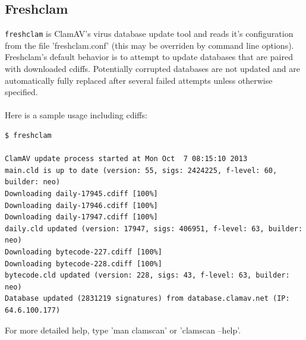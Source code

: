 \documentclass[a4paper,titlepage,12pt]{article}
\begin{document}
    \subsection{Freshclam}\label{sec:freshclam}
    \verb+freshclam+ is ClamAV's virus database update tool and reads it's
    configuration from the file 'freshclam.conf' (this may be
    overriden by command line options). Freshclam's default behavior is to
    attempt to update databases that are paired with downloaded cdiffs.
    Potentially corrupted databases are not updated and are automatically
    fully replaced after several failed attempts unless otherwise specified.
    \\\\
    Here is a sample usage including cdiffs:
{\footnotesize
    \begin{verbatim}
$ freshclam

ClamAV update process started at Mon Oct  7 08:15:10 2013
main.cld is up to date (version: 55, sigs: 2424225, f-level: 60, builder: neo)
Downloading daily-17945.cdiff [100%]
Downloading daily-17946.cdiff [100%]
Downloading daily-17947.cdiff [100%]
daily.cld updated (version: 17947, sigs: 406951, f-level: 63, builder: neo)
Downloading bytecode-227.cdiff [100%]
Downloading bytecode-228.cdiff [100%]
bytecode.cld updated (version: 228, sigs: 43, f-level: 63, builder: neo)
Database updated (2831219 signatures) from database.clamav.net (IP: 64.6.100.177)
    \end{verbatim}
}
    For more detailed help, type 'man clamscan' or 'clamscan --help'.
\end{document}
